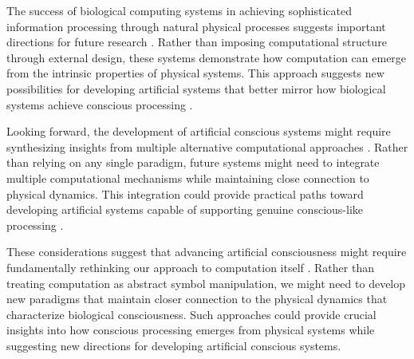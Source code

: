 The success of biological computing systems in achieving sophisticated information processing through natural physical processes suggests important directions for future research \cite{Mayne2019}. Rather than imposing computational structure through external design, these systems demonstrate how computation can emerge from the intrinsic properties of physical systems. This approach suggests new possibilities for developing artificial systems that better mirror how biological systems achieve conscious processing \cite{Nakagaki2020}.

Looking forward, the development of artificial conscious systems might require synthesizing insights from multiple alternative computational approaches \cite{Stepney2018}. Rather than relying on any single paradigm, future systems might need to integrate multiple computational mechanisms while maintaining close connection to physical dynamics. This integration could provide practical paths toward developing artificial systems capable of supporting genuine conscious-like processing \cite{Toffoli2019}.

These considerations suggest that advancing artificial consciousness might require fundamentally rethinking our approach to computation itself \cite{Zauner2020}. Rather than treating computation as abstract symbol manipulation, we might need to develop new paradigms that maintain closer connection to the physical dynamics that characterize biological consciousness. Such approaches could provide crucial insights into how conscious processing emerges from physical systems while suggesting new directions for developing artificial conscious systems.